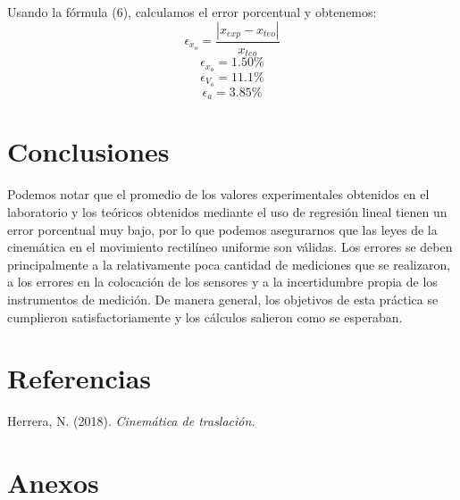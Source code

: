 \documentclass[a4paper]{article}
\begin{document}
Usando la fórmula (6), calculamos el error porcentual y obtenemos:
\[\epsilon_{x_o}=\frac{|x_{exp}-x_{teo}|}{x_{teo}}\]
\[\epsilon_{x_o}=1.50\%\]
\[\epsilon_{V_o}=11.1\%\]
\[\epsilon_{a}=3.85\%\]
\section{Conclusiones}
Podemos notar que el promedio de los valores experimentales obtenidos en el laboratorio y los teóricos obtenidos mediante el uso de regresión lineal tienen un error porcentual muy bajo, por lo que podemos asegurarnos que las leyes de la cinemática en el movimiento rectilíneo uniforme son válidas. Los errores se deben principalmente a la relativamente poca cantidad de mediciones que se realizaron, a los errores en la colocación de los sensores y a la incertidumbre propia de los instrumentos de medición. De manera general, los objetivos de esta práctica se cumplieron satisfactoriamente y los cálculos salieron como se esperaban.


\section{Referencias}
Herrera, N. (2018). \textit{Cinemática de traslación.}
\section{Anexos}
\end{document}
